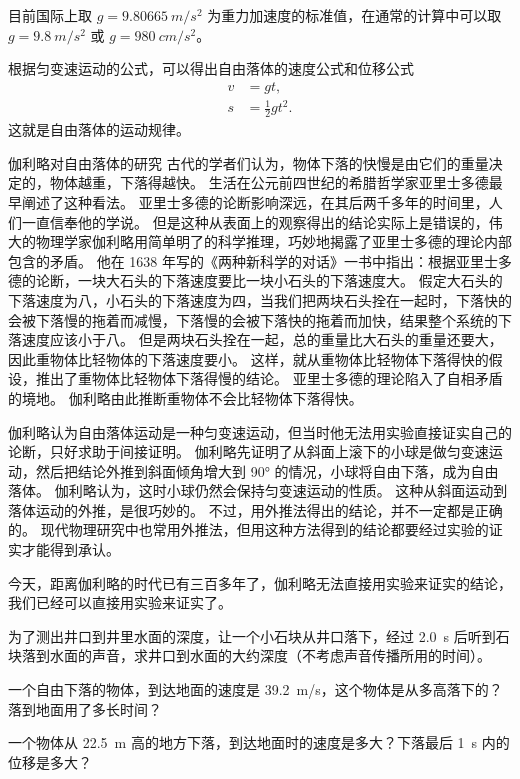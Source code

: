 目前国际上取 $g= \qty{9.80665}{m/s^2}$ 为重力加速度的标准值，在通常的计算中可以取 $g=\qty{9.8}{m/s^2}$ 或 $g=\qty{980}{cm/s^2}$。

根据匀变速运动的公式，可以得出自由落体的速度公式和位移公式
\[\begin{split}
v&=gt,\\
s&=\frac{1}{2}gt^2.
\end{split}\]
这就是自由落体的运动规律。

\begin{Reading}{伽利略对自由落体的研究}
古代的学者们认为，物体下落的快慢是由它们的重量决定的，物体越重，下落得越快。
生活在公元前四世纪的希腊哲学家亚里士多德最早阐述了这种看法。
亚里士多德的论断影响深远，在其后两千多年的时间里，人们一直信奉他的学说。
但是这种从表面上的观察得出的结论实际上是错误的，伟大的物理学家伽利略用简单明了的科学推理，巧妙地揭露了亚里士多德的理论内部包含的矛盾。
他在 1638 年写的《两种新科学的对话》一书中指出：根据亚里士多德的论断，一块大石头的下落速度要比一块小石头的下落速度大。
假定大石头的下落速度为八，小石头的下落速度为四，当我们把两块石头拴在一起时，下落快的会被下落慢的拖着而减慢，下落慢的会被下落快的拖着而加快，结果整个系统的下落速度应该小于八。
但是两块石头拴在一起，总的重量比大石头的重量还要大，因此重物体比轻物体的下落速度要小。
这样，就从重物体比轻物体下落得快的假设，推出了重物体比轻物体下落得慢的结论。
亚里士多德的理论陷入了自相矛盾的境地。
伽利略由此推断重物体不会比轻物体下落得快。

伽利略认为自由落体运动是一种匀变速运动，但当时他无法用实验直接证实自己的论断，只好求助于间接证明。
伽利略先证明了从斜面上滚下的小球是做匀变速运动，然后把结论外推到斜面倾角增大到 \ang{90} 的情况，小球将自由下落，成为自由落体。
伽利略认为，这时小球仍然会保持匀变速运动的性质。
这种从斜面运动到落体运动的外推，是很巧妙的。
不过，用外推法得出的结论，并不一定都是正确的。
现代物理研究中也常用外推法，但用这种方法得到的结论都要经过实验的证实才能得到承认。

今天，距离伽利略的时代已有三百多年了，伽利略无法直接用实验来证实的结论，我们已经可以直接用实验来证实了。
\end{Reading}

\begin{Practice}
\begin{question}
	\item 为了测出井口到井里水面的深度，让一个小石块从井口落下，经过 \qty{2.0}{s} 后听到石块落到水面的声音，求井口到水面的大约深度（不考虑声音传播所用的时间）。
  \item 一个自由下落的物体，到达地面的速度是 \qty{39.2}{m/s}，这个物体是从多高落下的？落到地面用了多长时间？
  \item 一个物体从 \qty{22.5}{m} 高的地方下落，到达地面时的速度是多大？下落最后 \qty{1}{s} 内的位移是多大？
\end{question}
\end{Practice}


